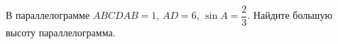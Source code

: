 \begin{ex}
	\begin{condition}
		В параллелограмме \(ABCD AB=1\), \(AD=6\),  \( \sin A=\dfrac{2}{3} \).  Найдите большую высоту параллелограмма.
	\end{condition}
\end{ex}